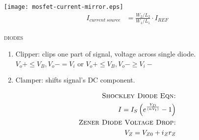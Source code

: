 \documentclass[10pt,letterpaper,english]{article}
\begin{document}
\texttt{[image: mosfet-current-mirror.eps]}
\begin{align*}
I_{current\ source}&= \frac{W_2/L_2}{W_1/L_1}\cdot I_{REF} \tag*{MOSFET current mirror circuit}
\end{align*}


\textsc{diodes}\\
\begin{multicols}{2}
\begin{enumerate}
\item{Clipper: clips one part of signal, voltage across single diode. $V_o+ \leq V_B, V_o- = V_i$ or $V_o+ \leq V_B, V_o- \geq V_i-$}
 \item{Clamper: shifts signal's DC component.}
\end{enumerate}
\begin{align*}
\textsc{Shockley Diode Eqn:}\\
I= I_S\left(e^{\frac{V_D}{\left(nV_t\right)}} - 1\right)\nonumber\\
\textsc{Zener Diode Voltage Drop:}\\
V_{Z} = V_{Z0} + i_Zr_Z\nonumber\\
\end{align*}
\end{multicols}
\end{document}

